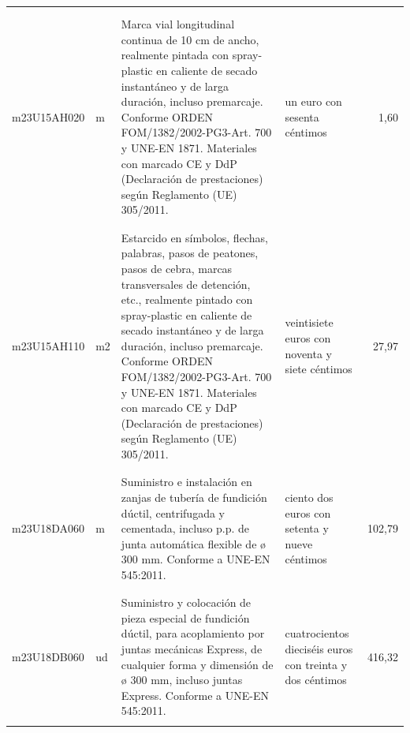 \begin{supertabular}{|l|l|p{5cm}|p{3cm}|r|}
&&&&\\%
&&&&\\%
m23U15AH020&m&Marca vial longitudinal continua de 10 cm de ancho, realmente pintada con spray{-}plastic en caliente de secado instantáneo y de larga duración, incluso premarcaje. Conforme ORDEN FOM/1382/2002{-}PG3{-}Art. 700 y UNE{-}EN 1871. Materiales con marcado CE y DdP (Declaración de prestaciones) según Reglamento (UE) 305/2011.&un euro con sesenta céntimos&1,60\\%
&&&&\\%
&&&&\\%
m23U15AH110&m2&Estarcido en símbolos, flechas, palabras, pasos de peatones, pasos de cebra, marcas transversales de detención, etc., realmente pintado con spray{-}plastic en caliente de secado instantáneo y de larga duración, incluso premarcaje. Conforme ORDEN FOM/1382/2002{-}PG3{-}Art. 700 y UNE{-}EN 1871. Materiales con marcado CE y DdP (Declaración de prestaciones) según Reglamento (UE) 305/2011.&veintisiete euros con noventa y siete céntimos&27,97\\%
&&&&\\%
&&&&\\%
m23U18DA060&m&Suministro e instalación en zanjas de tubería de fundición dúctil, centrifugada y cementada, incluso p.p. de junta automática flexible de ø 300 mm. Conforme a UNE{-}EN 545:2011.&ciento dos euros con setenta y nueve céntimos&102,79\\%
&&&&\\%
&&&&\\%
m23U18DB060&ud&Suministro y colocación de pieza especial de fundición dúctil, para acoplamiento por juntas mecánicas Express, de cualquier forma y dimensión de ø 300 mm, incluso juntas Express. Conforme a UNE{-}EN 545:2011.&cuatrocientos dieciséis euros con treinta y dos céntimos&416,32\\%
&&&&\\%
\end{supertabular}%
\normalsize%


%
